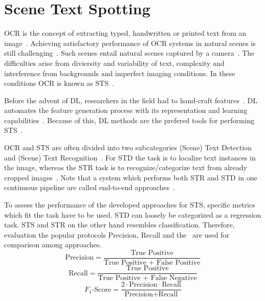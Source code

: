 \section{Scene Text Spotting}
\ac{OCR} is the concept of extracting typed, handwritten or printed text
from an image~\citep{zhao_improving_2020}.
Achieving satisfactory performance of \ac{OCR} systems in natural scenes is still
challenging~\citep{zhao_improving_2020, chen_text_2021}.
Such scenes entail natural scenes captured by a camera~\citep{chen_text_2021, baek_what_2019}.
The difficulties arise from diviersity and variability of text, complexity and interference from
backgrounds and imperfect imaging conditions.
In these conditions \ac{OCR} is known as \ac{STS}~\citep{long_scene_2021}.

Before the advent of \ac{DL}, researchers in the field had to hand-craft features~\citep{long_scene_2021}.
\ac{DL} automates the feature generation process with its representation and learning
capabilities~\citep{long_scene_2021,goodfellow_deep_2016}.
Because of this, \ac{DL} methods are the prefered tools for performing \ac{STS}~\citep{long_scene_2021}.

\ac{OCR} and \ac{STS} are often divided into two subcategories (Scene) Text Detection and (Scene)
Text Recognition~\citep{zhao_improving_2020, long_scene_2021,chen_text_2021}.
For \ac{STD} the task is to localize text instances in the image, whereas the \ac{STR} task
is to recognize/categorize text from already cropped images~\citep{chen_text_2021}.
Note that a system which performs both \ac{STR} and \ac{STD} in one continuous pipeline are called
end-to-end approaches~\citep{chen_text_2021}.

To assess the performance of the developed approaches for \ac{STS}, specific metrics which fit the
task have to be used.
\ac{STD} can loosely be categorized as a regression task. %
\ac{STS} and \ac{STR} on the other hand resembles classification.
Therefore, evaluation the popular protocols Precision, Recall and the \fone\ are used for
comparison among approaches.
\begin{equation}\label{eq:P}
    \text{Precision}=\frac{\text{True Positive}}{\text{True Positive + False Positive}}
\end{equation}
\begin{equation}\label{eq:R}
    \text{Recall}=\frac{\text{True Positive}}{\text{True Positive + False Negative}}
\end{equation}
\begin{equation}\label{eq:f1}
    F_1\text{-Score}=\frac{2\cdot \text{Precision}\cdot \text{Recall}}{\text{Precision}+\text{Recall}}
\end{equation}


